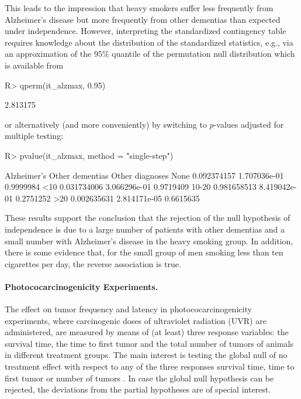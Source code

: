 \documentclass{article}
\newenvironment{Schunk}{}{}
\begin{document}
This leads to the impression that heavy smokers suffer less frequently
from Alzheimer's disease but more frequently from other dementias
than expected under independence.
However, interpreting the standardized contingency table requires
knowledge about the distribution of the standardized statistics, 
e.g., via an approximation of the $95\%$ quantile of the permutation 
null distribution which is available from
\begin{Schunk}
\begin{Sinput}
R> qperm(it_alzmax, 0.95)
\end{Sinput}
\begin{Soutput}
[1] 2.813175
\end{Soutput}
\end{Schunk}
or alternatively (and more conveniently) by
switching to $p$-values adjusted for multiple testing:
\begin{Schunk}
\begin{Sinput}
R> pvalue(it_alzmax, method = "single-step")
\end{Sinput}
\begin{Soutput}
      Alzheimer's Other dementias Other diagnoses
None  0.092374157    1.707036e-01       0.9999984
<10   0.031734006    3.066296e-01       0.9719409
10-20 0.981658513    8.419042e-01       0.2751252
>20   0.002635631    2.814171e-05       0.6615635
\end{Soutput}
\end{Schunk}
These results support the conclusion that the rejection of the 
null hypothesis of independence is due to a large number of patients
with other dementias and a small number with Alzheimer's disease in the heavy
smoking group. In addition, there is some evidence that, for the small
group of men smoking less than ten cigarettes per day, the reverse
association is true.

\paragraph{Photococarcinogenicity Experiments.}

The effect on tumor frequency and latency in photococarcinogenicity
experiments, where carcinogenic doses of ultraviolet radiation (UVR) are
administered, are measured by means of (at least) three response variables:
the survival time, the time to first tumor and the total number of tumors of
animals in different treatment groups. 
The main interest is testing the global null of no treatment 
effect with respect to any of the three responses survival time, time to first tumor or
number of tumors \citep[][analyze the detection time
of tumors in addition, this data is not given here]{Molefeetal2005}. 
In case the  global null hypothesis can be rejected, the deviations 
from the partial hypotheses are of special interest.
\end{document}
